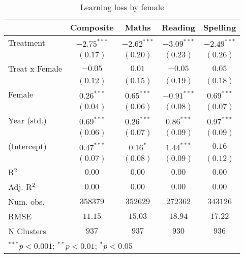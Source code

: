 
\begin{table}
\begin{center}
\begin{tabular}{l c c c c}
\hline
 & Composite & Maths & Reading & Spelling \\
\hline
Treatment      & $-2.75^{***}$ & $-2.62^{***}$ & $-3.09^{***}$ & $-2.49^{***}$ \\
               & $(0.17)$      & $(0.20)$      & $(0.23)$      & $(0.26)$      \\
Treat x Female & $-0.05$       & $0.01$        & $-0.05$       & $0.05$        \\
               & $(0.12)$      & $(0.15)$      & $(0.19)$      & $(0.18)$      \\
Female         & $0.26^{***}$  & $0.65^{***}$  & $-0.91^{***}$ & $0.69^{***}$  \\
               & $(0.04)$      & $(0.06)$      & $(0.08)$      & $(0.07)$      \\
Year (std.)    & $0.69^{***}$  & $0.26^{***}$  & $0.86^{***}$  & $0.97^{***}$  \\
               & $(0.06)$      & $(0.07)$      & $(0.09)$      & $(0.09)$      \\
(Intercept)    & $0.47^{***}$  & $0.16^{*}$    & $1.44^{***}$  & $0.16$        \\
               & $(0.07)$      & $(0.08)$      & $(0.09)$      & $(0.12)$      \\
\hline
R$^2$          & $0.00$        & $0.00$        & $0.00$        & $0.00$        \\
Adj. R$^2$     & $0.00$        & $0.00$        & $0.00$        & $0.00$        \\
Num. obs.      & $358379$      & $352629$      & $272362$      & $343126$      \\
RMSE           & $11.15$       & $15.03$       & $18.94$       & $17.22$       \\
N Clusters     & $937$         & $937$         & $930$         & $936$         \\
\hline
\multicolumn{5}{l}{\scriptsize{$^{***}p<0.001$; $^{**}p<0.01$; $^{*}p<0.05$}}
\end{tabular}
\caption{Learning loss by female}
\label{tablefemale}
\end{center}
\end{table}
